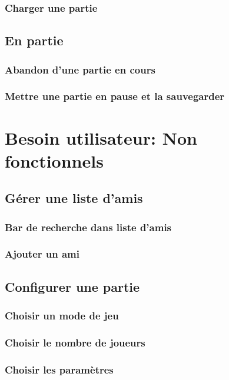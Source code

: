 \documentclass[utf8]{article}
\begin{document}
    \subsubsection{Charger une partie}
  \subsection{En partie}
    \subsubsection{Abandon d'une partie en cours}
    \subsubsection{Mettre une partie en pause et la sauvegarder}




\section{Besoin utilisateur: Non fonctionnels}
    \subsection{Gérer une liste d'amis}
        \subsubsection{Bar de recherche dans liste d'amis}
        \subsubsection{Ajouter un ami}
    \subsection{Configurer une partie}
        \subsubsection{Choisir un mode de jeu}
        \subsubsection{Choisir le nombre de joueurs}
        \subsubsection{Choisir les paramètres}
\end{document}
